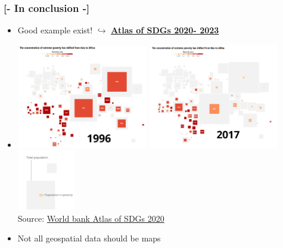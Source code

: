 \documentclass[xcolor=x11names,aspectratio=169, compress]{beamer}
\renewcommand{\(}{\begin{columns}}
\renewcommand{\)}{\end{columns}}
\newcommand{\<}[1]{\begin{column}{#1}}
\renewcommand{\>}{\end{column}}
\begin{document}
\begin{frame}
\frametitle{\textcolor{brique}{[-  \textbf{In conclusion }-]}}
\begin{itemize}[<+-|alert@+>]
    \item Good example exist! $\hookrightarrow$  \href{https://datatopics.worldbank.org/sdgatlas/goal-1-no-poverty?lang=en}{\textbf{Atlas of SDGs 2020- 2023}}
    \item[]
    \includegraphics[width = 0.45\textwidth]{PovertyMapSquares1996.PNG}
    \includegraphics[width = 0.45\textwidth]{PovertyMapSquares2017.PNG} \\
     \hfill \includegraphics[width = 0.20\textwidth]{PovertyMapSquaresLegend.PNG} \\
   \textcolor{gris}{\footnotesize{Source: \href{https://datatopics.worldbank.org/sdgatlas/archive/2020/goal-1-no-poverty/}{World bank Atlas of SDGs 2020}}}
  \item Not all geospatial data should be maps

\end{itemize}
\end{frame}


\end{document}
